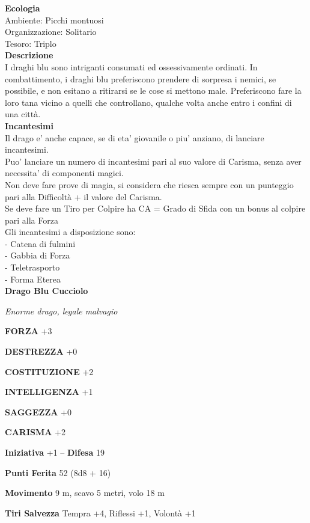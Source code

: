 \begin{multicols}{2}
\textbf{Ecologia}\\
Ambiente: Picchi montuosi\\
Organizzazione: Solitario\\
Tesoro: Triplo\\
\textbf{Descrizione}\\
I draghi blu sono intriganti consumati ed ossessivamente ordinati. In combattimento, i draghi blu preferiscono prendere di sorpresa i nemici, se possibile, e non esitano a ritirarsi se le cose si mettono male. Preferiscono fare la loro tana vicino a quelli che controllano, qualche volta anche entro i confini di una città.\\
\textbf{Incantesimi}\\
Il drago e' anche capace, se di eta' giovanile o piu' anziano, di lanciare incantesimi.\\
Puo' lanciare un numero di incantesimi pari al suo valore di Carisma, senza aver necessita' di componenti magici.\\
Non deve fare prove di magia, si considera che riesca sempre con un punteggio pari alla Difficoltà + il valore del Carisma.\\
Se deve fare un Tiro per Colpire ha CA = Grado di Sfida con un bonus al colpire pari alla Forza\\
Gli incantesimi a disposizione sono:\\
- Catena di fulmini\\
- Gabbia di Forza\\
- Teletrasporto\\
- Forma Eterea\\


\medskip{}\textbf{Drago Blu Cucciolo}

\emph{Enorme drago, legale malvagio}

\textbf{FORZA} +3

\textbf{DESTREZZA} +0

\textbf{COSTITUZIONE} +2

\textbf{INTELLIGENZA} +1

\textbf{SAGGEZZA} +0

\textbf{CARISMA} +2

\textbf{Iniziativa} +1 -- \textbf{Difesa} 19

\textbf{Punti Ferita} 52 (8d8 + 16)

\textbf{Movimento} 9 m, scavo 5 metri, volo 18 m

\textbf{Tiri Salvezza} Tempra +4, Riflessi +1, Volontà +1


\end{multicols}
